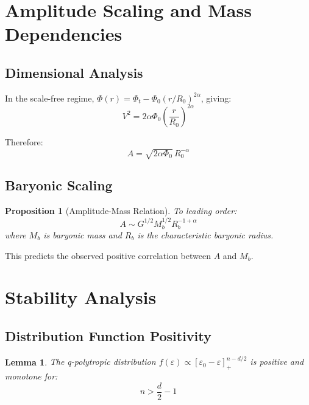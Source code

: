 \documentclass[12pt, a4paper]{article}
\newtheorem{lemma}{Lemma}
\newtheorem{proposition}{Proposition}
\theoremstyle{definition}
\theoremstyle{remark}
\begin{document}
\section{Amplitude Scaling and Mass Dependencies}

\subsection{Dimensional Analysis}

In the scale-free regime, $\Phi(r) = \Phi_t - \Phi_0(r/R_0)^{2\alpha}$, giving:
\begin{equation}
V^2 = 2\alpha\Phi_0\left(\frac{r}{R_0}\right)^{2\alpha}
\end{equation}

Therefore:
\begin{equation}
A = \sqrt{2\alpha\Phi_0} \, R_0^{-\alpha}
\end{equation}

\subsection{Baryonic Scaling}

\begin{proposition}[Amplitude-Mass Relation]
To leading order:
\begin{equation}
\boxed{A \sim G^{1/2}M_b^{1/2}R_b^{-1+\alpha}}
\end{equation}
where $M_b$ is baryonic mass and $R_b$ is the characteristic baryonic radius.
\end{proposition}

This predicts the observed positive correlation between $A$ and $M_b$.

\section{Stability Analysis}

\subsection{Distribution Function Positivity}

\begin{lemma}
The q-polytropic distribution $f(\varepsilon) \propto [\varepsilon_0 - \varepsilon]_+^{n-d/2}$ is positive and monotone for:
\begin{equation}
n > \frac{d}{2} - 1
\end{equation}
\end{lemma}
\end{document}
